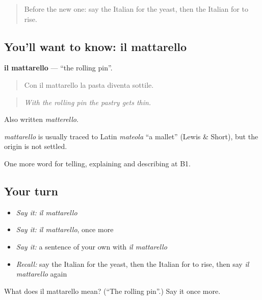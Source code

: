 \label{lesson:IT-C335-mattarello}



\begin{quote}
Before the new one: say the Italian for the yeast, then the Italian for to rise.
\end{quote}

\subsection*{You'll want to know: il mattarello}
\textbf{il mattarello} — \textquotedblleft{}the rolling pin\textquotedblright{}.

\begin{quote}
Con il mattarello la pasta diventa sottile.
\end{quote}

\begin{quote}
\emph{With the rolling pin the pastry gets thin.}
\end{quote}

Also written \emph{matterello}.

\begin{cousinweb}
\emph{mattarello} is usually traced to Latin \emph{mateola} \textquotedblleft{}a mallet\textquotedblright{} (Lewis \& Short), but the origin is not settled.
\end{cousinweb}

\begin{grammarlens}[title={What you've built}]
One more word for telling, explaining and describing at B1.
\end{grammarlens}

\subsection*{Your turn}
\begin{itemize}
\raggedright
  \item \emph{Say it:} \emph{il mattarello}
  \item \emph{Say it:} \emph{il mattarello}, once more
  \item \emph{Say it:} a sentence of your own with \emph{il mattarello}
  \item \emph{Recall:} say the Italian for the yeast, then the Italian for to rise, then say \emph{il mattarello} again
\end{itemize}

\begin{tcolorbox}[breakable,colback=teal!4,colframe=teal!35!black,title={Before you move on}]
What does il mattarello mean? (\textquotedblleft{}The rolling pin\textquotedblright{}.) Say it once more.
\end{tcolorbox}

